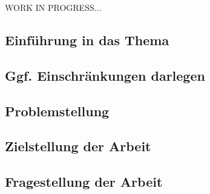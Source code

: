 WORK IN PROGRESS...

\subsection*{Einführung in das Thema }%
\subsection*{Ggf. Einschränkungen darlegen}
\subsection*{Problemstellung}
\subsection*{Zielstellung der Arbeit}
\subsection*{Fragestellung der Arbeit}

